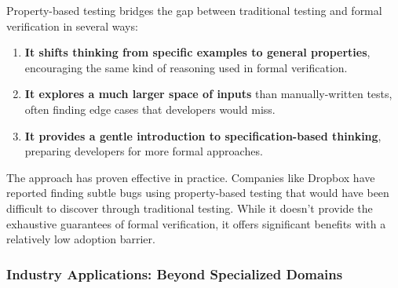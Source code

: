 \documentclass[11pt]{article}
\begin{document}
\begin{enumerate}
Property-based testing bridges the gap between traditional testing and formal verification in several ways:

\begin{enumerate}
\item \textbf{It shifts thinking from specific examples to general properties}, encouraging the same kind of reasoning used in formal verification.

\item \textbf{It explores a much larger space of inputs} than manually-written tests, often finding edge cases that developers would miss.

\item \textbf{It provides a gentle introduction to specification-based thinking}, preparing developers for more formal approaches.
\end{enumerate}

The approach has proven effective in practice. Companies like Dropbox have reported finding subtle bugs using property-based testing that would have been difficult to discover through traditional testing. While it doesn't provide the exhaustive guarantees of formal verification, it offers significant benefits with a relatively low adoption barrier.
\end{enumerate}
\subsubsection{Industry Applications: Beyond Specialized Domains}
\label{sec:orga8a3a1c}
\end{document}
